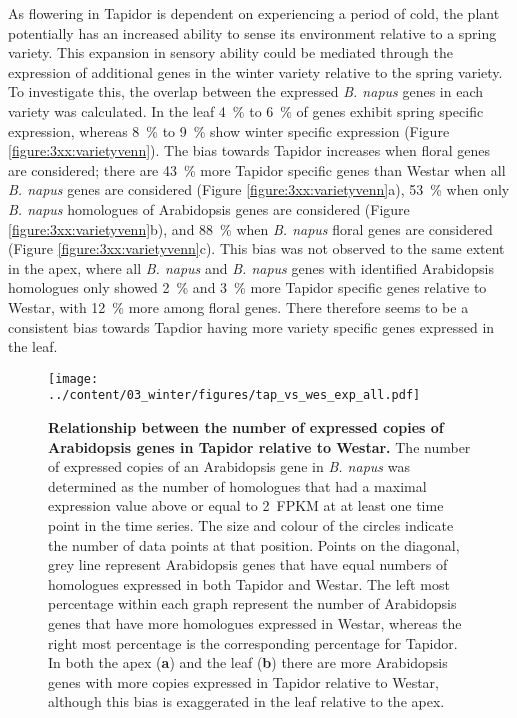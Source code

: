 \documentclass[12pt,]{book}
\begin{document}
As flowering in Tapidor is dependent on experiencing a period of cold,
the plant potentially has an increased ability to sense its environment
relative to a spring variety. This expansion in sensory ability could be
mediated through the expression of additional genes in the winter
variety relative to the spring variety. To investigate this, the overlap
between the expressed \emph{B. napus} genes in each variety was
calculated. In the leaf 4~\% to 6~\% of genes exhibit spring specific
expression, whereas 8~\% to 9~\% show winter specific expression (Figure
\ref{figure:3xx:varietyvenn}). The bias towards Tapidor increases when
floral genes are considered; there are 43~\% more Tapidor specific genes
than Westar when all \emph{B. napus} genes are considered (Figure
\ref{figure:3xx:varietyvenn}a), 53~\% when only \emph{B. napus}
homologues of Arabidopsis genes are considered (Figure
\ref{figure:3xx:varietyvenn}b), and 88~\% when \emph{B. napus} floral
genes are considered (Figure \ref{figure:3xx:varietyvenn}c). This bias
was not observed to the same extent in the apex, where all \emph{B.
napus} and \emph{B. napus} genes with identified Arabidopsis homologues
only showed 2~\% and 3~\% more Tapidor specific genes relative to
Westar, with 12~\% more among floral genes. There therefore seems to be
a consistent bias towards Tapdior having more variety specific genes
expressed in the leaf.

\begin{figure}[htbp]
\centering
\texttt{[image: ../content/03\_winter/figures/tap\_vs\_wes\_exp\_all.pdf]}
\caption{\textbf{Relationship between the number of expressed copies of
Arabidopsis genes in Tapidor relative to Westar.} The number of
expressed copies of an Arabidopsis gene in \emph{B. napus} was
determined as the number of homologues that had a maximal expression
value above or equal to 2~FPKM at at least one time point in the time
series. The size and colour of the circles indicate the number of data
points at that position. Points on the diagonal, grey line represent
Arabidopsis genes that have equal numbers of homologues expressed in
both Tapidor and Westar. The left most percentage within each graph
represent the number of Arabidopsis genes that have more homologues
expressed in Westar, whereas the right most percentage is the
corresponding percentage for Tapidor. In both the apex (\textbf{a}) and
the leaf (\textbf{b}) there are more Arabidopsis genes with more copies
expressed in Tapidor relative to Westar, although this bias is
exaggerated in the leaf relative to the
apex.}\label{figure:3xx:tapvswesall}
\end{figure}
\end{document}
